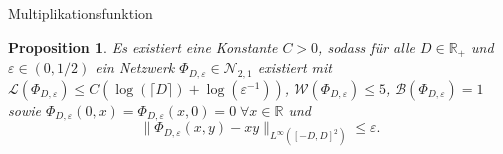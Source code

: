\documentclass[10pt,aspectratio=169]{beamer}
\theoremstyle{plain} %
\newtheorem{proposition}[theorem]{Proposition}
\theoremstyle{remark} %
\newcommand{\R}{\mathbb{R}} %
\newcommand{\norm}[1]{\|#1\|}
\begin{document}
\begin{frame}{Multiplikationsfunktion}
    \begin{proposition} %
        Es existiert eine Konstante \(C>0\), sodass für alle \(D\in \R_+\) und \(\varepsilon \in (0, 1/2)\) 
        ein Netzwerk \(\Phi_{D,\varepsilon} \in \mathcal{N}_{2,1}\) existiert mit 
        \(\mathcal{L}(\Phi_{D, \varepsilon}) \leq C (\log(\lceil D \rceil) + \log(\varepsilon^{-1})) \), 
        \(\mathcal{W}(\Phi_{D, \varepsilon}) \leq 5\), \(\mathcal{B}(\Phi_{D, \varepsilon}) = 1\) sowie 
        \(\Phi_{D,\varepsilon}(0,x) = \Phi_{D,\varepsilon}(x,0) = 0 \;\forall x\in \R\) und 
        \[ \norm{\Phi_{D,\varepsilon}(x,y) - xy}_{L^\infty([-D,D]^2)} \leq \varepsilon. \]
    \end{proposition}
\end{frame}
\end{document}

